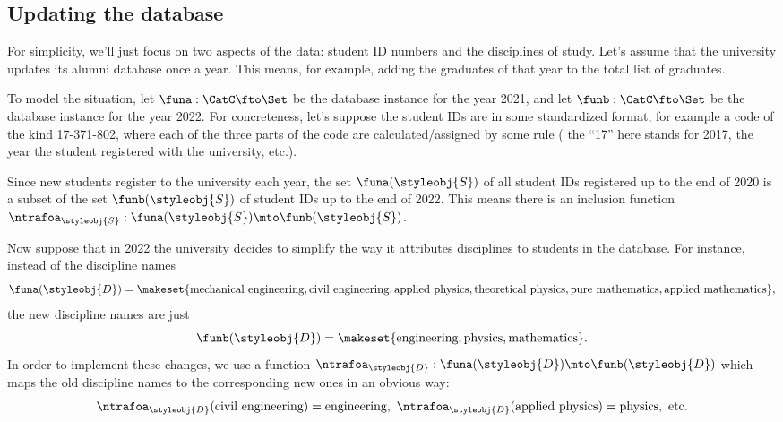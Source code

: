 \subsection{Updating the database}

For simplicity, we'll just focus on two aspects of the data: student ID numbers and the disciplines of study.
Let's assume that the university updates its alumni database once a year.
This means, for example, adding the graduates of that year to the total list of graduates. 

To model the situation, let $\funa : \CatC \fto \Set$ be the database instance for the year 2021, and let $\funb : \CatC \fto \Set$ be the database instance for the year 2022. For concreteness, let's suppose the student IDs are in some standardized format, for example a code of the kind 17-371-802, where each of the three parts of the code are calculated/assigned by some rule ( the ``17'' here stands for 2017, the year the student registered with the university, etc.). 

Since new students register to the university each year, the set $\funa(\styleobj{S})$ of all student IDs registered up to the end of 2020 is a subset of the set $\funb(\styleobj{S})$ of student IDs up to the end of 2022. This means there is an inclusion function $\ntrafoa_{\styleobj{S}} :  \funa(\styleobj{S}) \mto \funb(\styleobj{S})$. 

Now suppose that in 2022 the university decides to simplify the way it attributes disciplines to students in the database. For instance, instead of the discipline names 
\begin{equation}
\funa(\styleobj{D}) = \makeset{ \text{mechanical engineering},  \text{civil engineering}, \text{applied physics}, \text{theoretical physics}, \text{pure mathematics}, \text{applied mathematics} }, 
\end{equation}
the new discipline names are just
\begin{equation}
\funb(\styleobj{D}) = \makeset{ \text{engineering}, \text{physics}, \text{mathematics} }.
\end{equation}
In order to implement these changes, we use a function $\ntrafoa_{\styleobj{D}}: \funa(\styleobj{D}) \mto \funb(\styleobj{D})$ which maps the old discipline names to the corresponding new ones in an obvious way: 
\begin{equation*}
\ntrafoa_{\styleobj{D}}(\text{civil engineering}) = \text{engineering}, \ \ntrafoa_{\styleobj{D}}(\text{applied physics}) = \text{physics}, \ \text{etc.}
\end{equation*}

